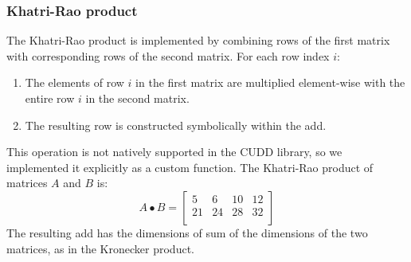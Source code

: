 \subsubsection{Khatri-Rao product}
The Khatri-Rao product is implemented by combining rows of the first matrix with corresponding rows of the second matrix. For each row index $i$:
\begin{enumerate}
    \item The elements of row $i$ in the first matrix are multiplied element-wise with the entire row $i$ in the second matrix.
    \item The resulting row is constructed symbolically within the \gls{add}.   
\end{enumerate}
This operation is not natively supported in the CUDD library, so we implemented it explicitly as a custom function.
The Khatri-Rao product of matrices $A$ and $B$ is:
\[
    A \bullet B = \begin{bmatrix}
        5  & 6  & 10 & 12 \\
        21 & 24 & 28 & 32 \\
    \end{bmatrix}
\]
The resulting \gls{add} has the dimensions of sum of the dimensions of the two matrices, as in the Kronecker product.


